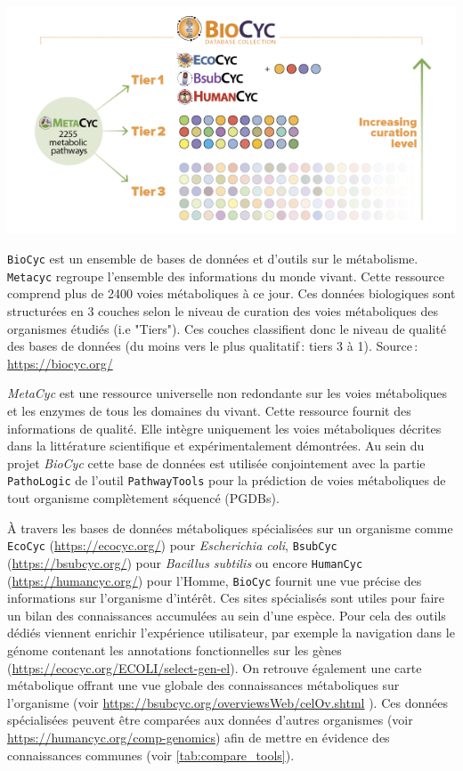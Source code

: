 \begin{refsegment}
    
    \begin{shadedfigure}[H]
    	\centering
    	\includegraphics[width=\textwidth]{img/BioCycCollection.png}
    	\caption{\texttt{BioCyc} est un ensemble de bases de données et d'outils sur le métabolisme. \texttt{Metacyc} regroupe l'ensemble des informations du monde vivant. Cette ressource comprend plus de 2400 voies métaboliques à ce jour. Ces données biologiques sont structurées en 3 couches selon le niveau de curation des voies métaboliques des organismes étudiés (i.e "Tiers"). Ces couches classifient donc le niveau de qualité des bases de données  (du moins vers le plus qualitatif : tiers 3 à 1). \hspace{\textwidth} Source : \url{https://biocyc.org/}    }
    	\label{fig:biocyc_collection}
    \end{shadedfigure}
    
    \textit{MetaCyc} \cite{Karp2011,caspi2013metacyc,caspi2016metacyc} est une ressource universelle non redondante sur les voies métaboliques et les enzymes de tous les domaines du vivant. Cette ressource fournit des informations de qualité. Elle intègre uniquement les voies métaboliques décrites dans la littérature scientifique et expérimentalement démontrées. Au sein du projet \textit{BioCyc} cette base de données est utilisée conjointement avec la partie \texttt{PathoLogic} de l'outil \texttt{PathwayTools} pour la prédiction de voies métaboliques de tout organisme complètement séquencé (PGDBs).  
    
    À travers les bases de données métaboliques spécialisées sur un organisme comme \texttt{EcoCyc} (\url{https://ecocyc.org/}) pour \textit{Escherichia coli}, \texttt{BsubCyc} (\url{https://bsubcyc.org/}) pour \textit{Bacillus subtilis} ou encore \texttt{HumanCyc} (\url{https://humancyc.org/}) pour l'Homme, \texttt{BioCyc} fournit une vue précise des informations sur l'organisme d'intérêt. Ces sites spécialisés sont utiles pour faire un bilan des connaissances accumulées au sein d'une espèce. Pour cela des outils dédiés viennent enrichir l'expérience utilisateur, par exemple la navigation dans le génome contenant les annotations fonctionnelles sur les gènes (\url{https://ecocyc.org/ECOLI/select-gen-el}). On retrouve également une carte métabolique offrant une vue globale des connaissances métaboliques sur l'organisme (voir \url{https://bsubcyc.org/overviewsWeb/celOv.shtml} ). Ces données spécialisées peuvent être comparées aux données d'autres organismes  (voir \url{https://humancyc.org/comp-genomics}) afin de mettre en évidence des connaissances communes (voir \cref{tab:compare_tools}).
    

\end{refsegment}
